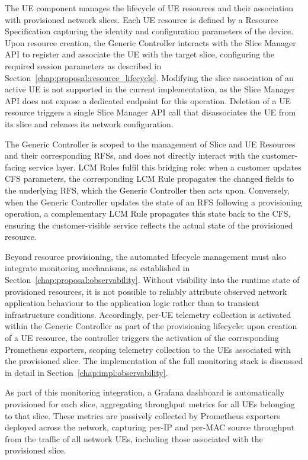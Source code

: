 The \acs{UE} component manages the lifecycle of \acs{UE} resources and their association with provisioned network slices. Each \acs{UE} resource is defined by a Resource Specification capturing the identity and configuration parameters of the device. Upon resource creation, the Generic Controller interacts with the Slice Manager \acs{API} to register and associate the \acs{UE} with the target slice, configuring the required session parameters as described in Section~\ref{chap:proposal:resource_lifecycle}. Modifying the slice association of an active \acs{UE} is not supported in the current implementation, as the Slice Manager \acs{API} does not expose a dedicated endpoint for this operation. Deletion of a \acs{UE} resource triggers a single Slice Manager \acs{API} call that disassociates the \acs{UE} from its slice and releases its network configuration.




The Generic Controller is scoped to the management of Slice and \acs{UE} Resources and their corresponding \acsp{RFS}, and does not directly interact with the customer-facing service layer. LCM Rules fulfil this bridging role: when a customer updates \acs{CFS} parameters, the corresponding LCM Rule propagates the changed fields to the underlying \acs{RFS}, which the Generic Controller then acts upon. Conversely, when the Generic Controller updates the state of an \acs{RFS} following a provisioning operation, a complementary LCM Rule propagates this state back to the \acs{CFS}, ensuring the customer-visible service reflects the actual state of the provisioned resource.

Beyond resource provisioning, the automated lifecycle management must also integrate monitoring mechanisms, as established in Section~\ref{chap:proposal:observability}. Without visibility into the runtime state of provisioned resources, it is not possible to reliably attribute observed network application behaviour to the application logic rather than to transient infrastructure conditions. Accordingly, per-\acs{UE} telemetry collection is activated within the Generic Controller as part of the provisioning lifecycle: upon creation of a \acs{UE} resource, the controller triggers the activation of the corresponding Prometheus exporters, scoping telemetry collection to the \acsp{UE} associated with the provisioned slice. The implementation of the full monitoring stack is discussed in detail in Section~\ref{chap:impl:observability}.

As part of this monitoring integration, a Grafana dashboard is automatically provisioned for each slice, aggregating throughput metrics for all \acsp{UE} belonging to that slice. These metrics are passively collected by Prometheus exporters deployed across the network, capturing per-\acs{IP} and per-\acs{MAC} source throughput from the traffic of all network \acsp{UE}, including those associated with the provisioned slice.

